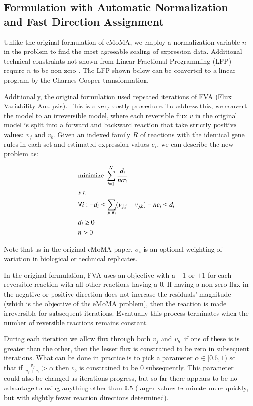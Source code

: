 \documentclass[phd,tocprelim]{cornell}
\begin{document}
\subsection{Formulation with Automatic Normalization and Fast Direction Assignment}
Unlike the original formulation of eMoMA, we employ a normalization variable $n$ in the problem
to find the most agreeable scaling of expression data. Additional technical constraints not shown
from Linear Fractional Programming (LFP) require $n$ to be non-zero \cite{Boyd2004}. The
LFP shown below can be converted to a linear program by the Charnes-Cooper transformation.

Additionally, the original formulation
used repeated iterations of FVA (Flux Variability Analysis). This is a very costly procedure. 
To address this, we convert the model to an irreversible model, where each reversible flux $v$
in the original model is split into a forward and backward reaction that take strictly positive
values: $v_f$ and $v_b$. Given an indexed family $R$ of reactions with the identical gene rules in each
set and estimated expression values $e_i$, we can describe the new problem as:

\begin{align*}
&\textnormal{minimize}\ \sum^N_{i=1}\frac{d_i}{n \sigma_i}  \\
&s.t. \\
&\forall i: -d_i \leq \sum_{j \in R_i}(v_{j,f} + v_{j,b}) - n e_i \leq d_i \\
&d_i \geq 0 \\
&n > 0
\end{align*}

Note that as in the original eMoMA paper, $\sigma_i$ is an optional weighting of variation
in biological or technical replicates. 

In the original formulation, FVA uses an objective with a $-1$ or $+1$ for each reversible reaction 
with all other reactions having a 0. If having a non-zero flux in the negative or positive direction
does not increase the residuals' magnitude (which is the objective of the eMoMA problem), then 
the reaction is made irreversible for subsequent iterations. Eventually this process terminates
when the number of reversible reactions remains constant. 

During each iteration we allow flux through both $v_f$ and $v_b$; if one of these is is greater 
than the other, then the lesser flux is constrained to be zero in subsequent iterations. What
can be done in practice is to pick a parameter $\alpha \in [0.5,1)$ so that if
$\frac{v_f}{v_f+v_b} > \alpha$ then $v_b$ is constrained to be 0 subsequently. This parameter could
also be changed as iterations progress, but so far there appears to be no advantage to using
anything other than $0.5$ (larger values terminate more quickly, but with slightly fewer reaction
directions determined).
\end{document}

